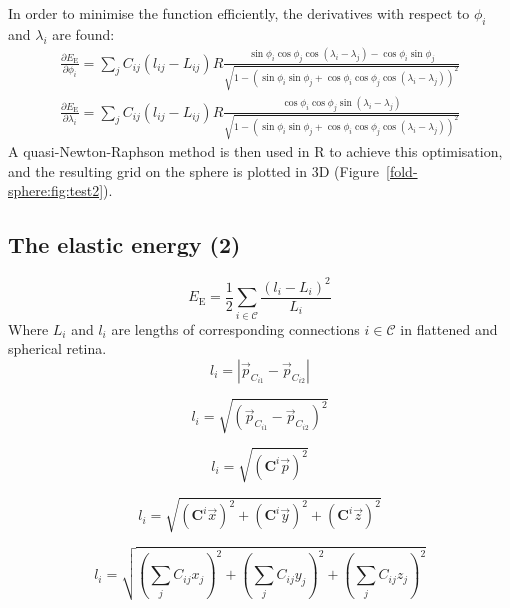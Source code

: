 \documentclass{article}
\newcommand{\EE}{\ensuremath{E_\mathrm{E}}\xspace}
\begin{document}
In order to minimise the function efficiently, the derivatives with
respect to $\phi_i$ and $\lambda_i$ are found:
\begin{equation}
  \label{fold-sphere:eq:3}
  \begin{split}
    \frac{\partial \EE}{\partial\phi_i} = 
    \sum_j C_{ij} (l_{ij} - L_{ij})R
    \frac{\sin\phi_i\cos\phi_j\cos(\lambda_i-\lambda_j) - \cos\phi_i\sin\phi_j}
    {\sqrt{1-(\sin\phi_i\sin\phi_j +
        \cos\phi_i\cos\phi_j\cos(\lambda_i-\lambda_j))^2}} \\
    \frac{\partial \EE}{\partial\lambda_i} = 
    \sum_j C_{ij} (l_{ij} - L_{ij})R
    \frac{\cos\phi_i\cos\phi_j\sin(\lambda_i-\lambda_j)}
    {\sqrt{1-(\sin\phi_i\sin\phi_j + \cos\phi_i\cos\phi_j\cos(\lambda_i-\lambda_j))^2}}
  \end{split}
\end{equation}
A quasi-Newton-Raphson method is then used in R to achieve this
optimisation, and the resulting grid on the sphere is plotted in 3D
(Figure~\ref{fold-sphere:fig:test2}).


\subsection{The elastic energy (2)}
\label{fold-sphere:sec:elastic-energy-2}

\begin{displaymath}
  E_\mathrm{E} = \frac{1}{2} \sum_{i\in\mathcal{C}} \frac{(l_i - L_i)^2}{L_i}  
\end{displaymath}
Where $L_i$ and $l_i$ are lengths of corresponding connections
$i\in\mathcal{C}$ in flattened and spherical retina.
\begin{displaymath}
  l_i = |\vec{p}_{C_{i1}} - \vec{p}_{C_{i2}}|
\end{displaymath}

\begin{displaymath}
  l_i = \sqrt{(\vec{p}_{C_{i1}} - \vec{p}_{C_{i2}})^2}
\end{displaymath}

\begin{displaymath}
  l_i = \sqrt{(\mathbf{C}^i\vec{p})^2}
\end{displaymath}

\begin{displaymath}
  l_i = \sqrt{(\mathbf{C}^i\vec{x})^2 + 
    (\mathbf{C}^i\vec{y})^2 + 
    (\mathbf{C}^i\vec{z})^2}
\end{displaymath}

\begin{displaymath}
  l_i = \sqrt{(\sum_jC_{ij}x_j)^2 + 
    (\sum_jC_{ij}y_j)^2 +
    (\sum_jC_{ij}z_j)^2}
\end{displaymath}
\end{document}
